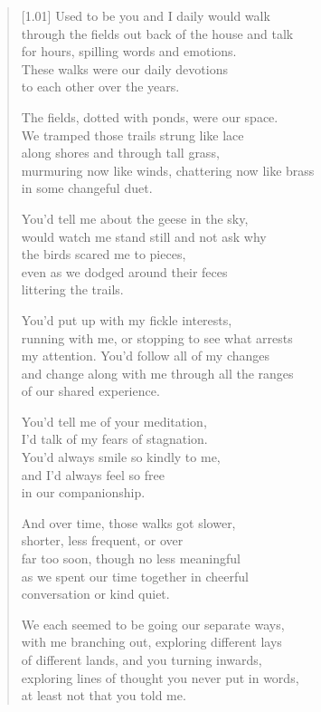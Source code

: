 
\begin{verse}[1.01\textwidth]
Used to be you and I daily would walk\\
through the fields out back of the house and talk\\
for hours, spilling words and emotions.\\
These walks were our daily devotions\\
to each other over the years.

The fields, dotted with ponds, were our space.\\
We tramped those trails strung like lace\\
along shores and through tall grass,\\
murmuring now like winds, chattering now like brass\\
in some changeful duet.

You'd tell me about the geese in the sky,\\
would watch me stand still and not ask why\\
the birds scared me to pieces,\\
even as we dodged around their feces\\
littering the trails.

You'd put up with my fickle interests,\\
running with me, or stopping to see what arrests\\
my attention. You'd follow all of my changes\\
and change along with me through all the ranges\\
of our shared experience.

\newpage

\null
\vspace{1cm}

You'd tell me of your meditation,\\
I'd talk of my fears of stagnation.\\
You'd always smile so kindly to me,\\
and I'd always feel so free\\
in our companionship.

And over time, those walks got slower,\\
shorter, less frequent, or over\\
far too soon, though no less meaningful\\
as we spent our time together in cheerful\\
conversation or kind quiet.

We each seemed to be going our separate ways,\\
with me branching out, exploring different lays\\
of different lands, and you turning inwards,\\
exploring lines of thought you never put in words,\\
at least not that you told me.


\end{verse}
